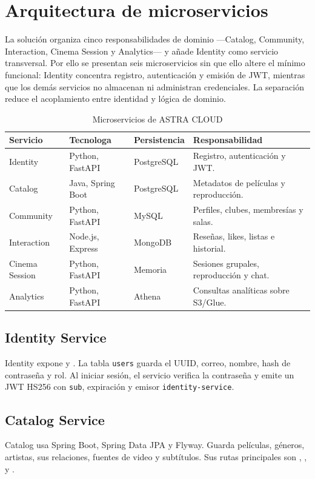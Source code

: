 ﻿\chapter{Arquitectura de microservicios}
La solución organiza cinco responsabilidades de dominio ---Catalog, Community, Interaction, Cinema Session y Analytics--- y añade Identity como servicio transversal. Por ello se presentan seis microservicios sin que ello altere el mínimo funcional: Identity concentra registro, autenticación y emisión de JWT, mientras que los demás servicios no almacenan ni administran credenciales. La separación reduce el acoplamiento entre identidad y lógica de dominio.
\begin{table}[H]\centering\small\renewcommand{\arraystretch}{1.2}\caption{Microservicios de ASTRA CLOUD}\begin{tabularx}{\textwidth}{p{}p{}p{}X}\toprule Servicio&Tecnologa&Persistencia&Responsabilidad\\\midrule
Identity&Python, FastAPI&PostgreSQL&Registro, autenticación y JWT.\\
Catalog&Java, Spring Boot&PostgreSQL&Metadatos de películas y reproducción.\\
Community&Python, FastAPI&MySQL&Perfiles, clubes, membresías y salas.\\
Interaction&Node.js, Express&MongoDB&Reseñas, likes, listas e historial.\\
Cinema Session&Python, FastAPI&Memoria&Sesiones grupales, reproducción y chat.\\
Analytics&Python, FastAPI&Athena&Consultas analíticas sobre S3/Glue.\\\bottomrule\end{tabularx}\end{table}
\section{Identity Service}
Identity expone  y . La tabla \texttt{users} guarda el UUID, correo, nombre, hash de contraseña y rol. Al iniciar sesión, el servicio verifica la contraseña y emite un JWT HS256 con \texttt{sub}, expiración y emisor \texttt{identity-service}.
\section{Catalog Service}
Catalog usa Spring Boot, Spring Data JPA y Flyway. Guarda películas, géneros, artistas, sus relaciones, fuentes de video y subtítulos. Sus rutas principales son , ,  y .
